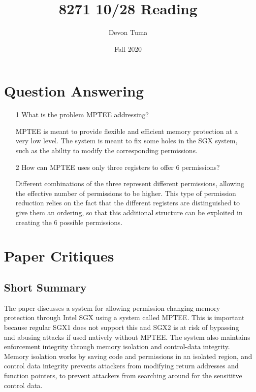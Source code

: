 \documentclass[11pt]{article}
\title{8271 10/28 Reading}
\author{Devon Tuma}
\date{Fall 2020}
\begin{document}
\maketitle

\section*{Question Answering}

\begin{itemize}
\item [1] What is the problem MPTEE addressing?

  MPTEE is meant to provide flexible and efficient memory protection at a very low level.
  The system is meant to fix some holes in the SGX system, such as the ability to modify the corresponding permissions.
  
\item [2] How can MPTEE uses only three registers to offer 6 permissions?

  Different combinations of the three represent different permissions, allowing the effective number of permissions to be higher.
  This type of permission reduction relies on the fact that the different registers are distinguished to give them an ordering, so that this additional structure can be exploited in creating the 6 possible permissions.
  
\end{itemize}

\section*{Paper Critiques}

\subsection*{Short Summary}

The paper discusses a system for allowing permission changing memory protection through Intel SGX using a system called MPTEE.
This is important because regular SGX1 does not support this and SGX2 is at risk of bypassing and abusing attacks if used natively without MPTEE.
The system also maintains enforcement integrity through memory isolation and control-data integrity.
Memory isolation works by saving code and permissions in an isolated region, and control data integrity prevents attackers from modifying return addresses and function pointers, to prevent attackers from searching around for the sensititve control data.
\end{document}
